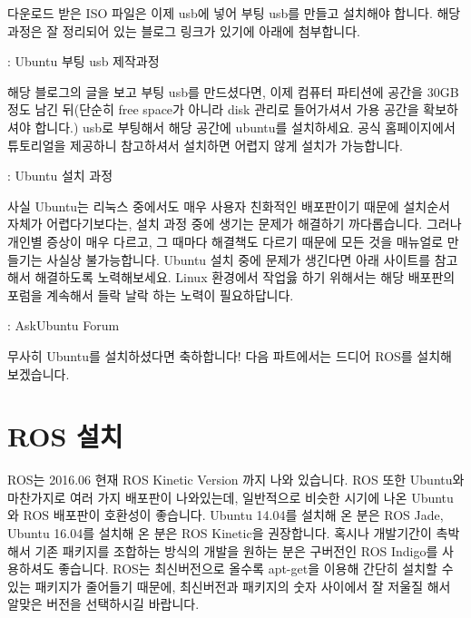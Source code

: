 \documentclass[11pt,fleqn]{book} %
\begin{document}
다운로드 받은 ISO 파일은 이제 usb에 넣어 부팅 usb를 만들고 설치해야 합니다.
해당 과정은 잘 정리되어 있는 블로그 링크가 있기에 아래에 첨부합니다.

\begin{link}
: Ubuntu 부팅 usb 제작과정
\end{link}

해당 블로그의 글을 보고 부팅 usb를 만드셨다면, 이제 컴퓨터 파티션에 공간을 30GB정도 남긴 뒤(단순히 free space가 아니라 disk 관리로 들어가셔서 가용 공간을 확보하셔야 합니다.) usb로 부팅해서 해당 공간에 ubuntu를 설치하세요.
공식 홈페이지에서 튜토리얼을 제공하니 참고하셔서 설치하면 어렵지 않게 설치가 가능합니다.

\begin{link}
: Ubuntu 설치 과정
\end{link}

사실 Ubuntu는 리눅스 중에서도 매우 사용자 친화적인 배포판이기 때문에 설치순서 자체가 어렵다기보다는, 설치 과정 중에 생기는 문제가 해결하기 까다롭습니다.
그러나 개인별 증상이 매우 다르고, 그 때마다 해결책도 다르기 때문에 모든 것을 매뉴얼로 만들기는 사실상 불가능합니다.
Ubuntu 설치 중에 문제가 생긴다면 아래 사이트를 참고해서 해결하도록 노력해보세요.
Linux 환경에서 작업읋 하기 위해서는 해당 배포판의 포럼을 계속해서 들락 날락 하는 노력이 필요하답니다.

\begin{link}
: AskUbuntu Forum
\end{link}

무사히 Ubuntu를 설치하셨다면 축하합니다! 다음 파트에서는 드디어 ROS를 설치해 보겠습니다.


\section{ROS 설치}

ROS는 2016.06 현재 ROS Kinetic Version 까지 나와 있습니다. ROS 또한 Ubuntu와 마찬가지로 여러 가지 배포판이 나와있는데, 일반적으로 비슷한 시기에 나온 Ubuntu와 ROS 배포판이 호환성이 좋습니다.
Ubuntu 14.04를 설치해 온 분은 ROS Jade, Ubuntu 16.04를 설치해 온 분은 ROS Kinetic을 권장합니다. 혹시나 개발기간이 촉박해서 기존 패키지를 조합하는 방식의 개발을 원하는 분은 구버전인 ROS Indigo를 사용하셔도 좋습니다.
ROS는 최신버전으로 올수록 apt-get을 이용해 간단히 설치할 수 있는 패키지가 줄어들기 때문에, 최신버전과 패키지의 숫자 사이에서 잘 저울질 해서 알맞은 버전을 선택하시길 바랍니다.
\end{document}
